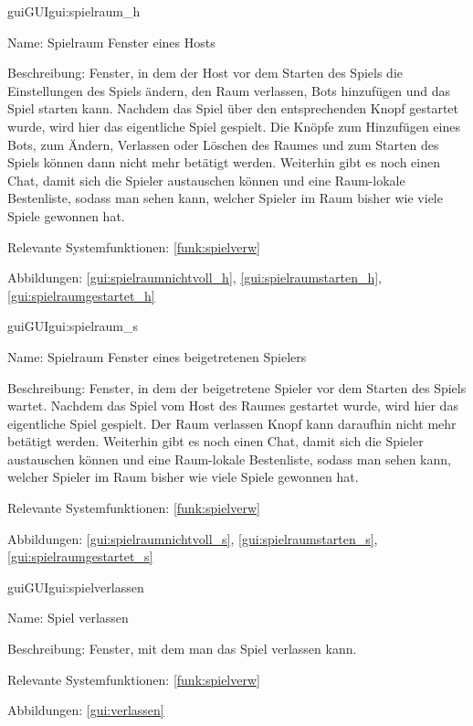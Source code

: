 \begin{description}[leftmargin=5em, style=sameline]	
	\begin{lhp}{gui}{GUI}{gui:spielraum_h}
		\item[Name:] Spielraum Fenster eines Hosts
		\item[Beschreibung:] Fenster, in dem der Host vor dem Starten des Spiels die Einstellungen des Spiels ändern, den Raum verlassen, Bots hinzufügen und das Spiel starten kann. Nachdem das Spiel über den entsprechenden Knopf gestartet wurde, wird hier das eigentliche Spiel gespielt. Die Knöpfe zum Hinzufügen eines Bots, zum Ändern, Verlassen oder Löschen des Raumes und zum Starten des Spiels können dann nicht mehr betätigt werden. Weiterhin gibt es noch einen Chat, damit sich die Spieler austauschen können und eine Raum-lokale Bestenliste, sodass man sehen kann, welcher Spieler im Raum bisher wie viele Spiele gewonnen hat.
		\item[Relevante Systemfunktionen:] \ref{funk:spielverw}
		\item[Abbildungen:] \ref{gui:spielraumnichtvoll_h}, \ref{gui:spielraumstarten_h}, \ref{gui:spielraumgestartet_h}
	\end{lhp}
\end{description}


\begin{description}[leftmargin=5em, style=sameline]	
	\begin{lhp}{gui}{GUI}{gui:spielraum_s}
		\item[Name:] Spielraum Fenster eines beigetretenen Spielers
		\item[Beschreibung:] Fenster, in dem der beigetretene Spieler vor dem Starten des Spiels wartet. Nachdem das Spiel vom Host des Raumes gestartet wurde, wird hier das eigentliche Spiel gespielt. Der Raum verlassen Knopf kann daraufhin nicht mehr betätigt werden. Weiterhin gibt es noch einen Chat, damit sich die Spieler austauschen können und eine Raum-lokale Bestenliste, sodass man sehen kann, welcher Spieler im Raum bisher wie viele Spiele gewonnen hat.
		\item[Relevante Systemfunktionen:] \ref{funk:spielverw}
		\item[Abbildungen:] \ref{gui:spielraumnichtvoll_s}, \ref{gui:spielraumstarten_s}, \ref{gui:spielraumgestartet_s}
	\end{lhp}
\end{description}


\begin{description}[leftmargin=5em, style=sameline]	
	\begin{lhp}{gui}{GUI}{gui:spielverlassen}
		\item[Name:] Spiel verlassen
		\item[Beschreibung:] Fenster, mit dem man das Spiel verlassen kann. 
		\item[Relevante Systemfunktionen:] \ref{funk:spielverw}
		\item[Abbildungen:] \ref{gui:verlassen}
	\end{lhp}
\end{description}

